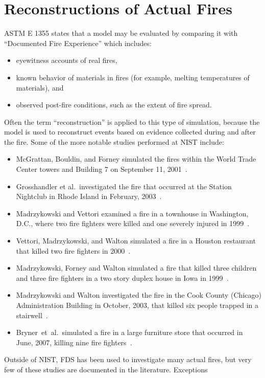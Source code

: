 \section{Reconstructions of Actual Fires}

ASTM E 1355 states that a model may be evaluated by comparing it with ``Documented Fire Experience'' which includes:
\begin{itemize}
\item eyewitness accounts of real fires,
\item known behavior of materials in fires (for example, melting temperatures of materials), and
\item observed post-fire conditions, such as the extent of fire spread.
\end{itemize}
Often the term ``reconstruction'' is applied to this type of simulation, because the model is used to reconstruct events based on evidence collected during and after the fire. Some of the more notable studies performed at NIST include:
\begin{itemize}
\item McGrattan, Bouldin, and Forney simulated the fires within the World Trade Center towers and Building 7 on September 11, 2001~\cite{NIST_NCSTAR_1-5F}.
\item Grosshandler et al.~investigated the fire that occurred at the Station Nightclub in Rhode Island in February, 2003~\cite{Grosshandler:Station}. 
\item Madrzykowski and Vettori examined a fire in a townhouse in Washington, D.C., where two fire fighters were killed and one severely injured in 1999~\cite{Madrzykowski:1}. 
\item Vettori, Madrzykowski, and Walton simulated a fire in a Houston restaurant that killed two fire fighters in 2000~\cite{Texas}. 
\item Madrzykowski, Forney and Walton simulated a fire that killed three children and three fire fighters in a two story duplex house in Iowa in 1999~\cite{Iowa}. 
\item Madrzykowski and Walton investigated the fire in the Cook County (Chicago) Administration Building in October, 2003, that killed six people trapped in a stairwell~\cite{Cook_County}. 
\item Bryner~et~al.~simulated a fire in a large furniture store that occurred in June, 2007, killing nine fire fighters~\cite{Bryner:Charleston}.
\end{itemize}
Outside of NIST, FDS has been used to investigate many actual fires, but very few of these studies are documented in the literature. Exceptions
